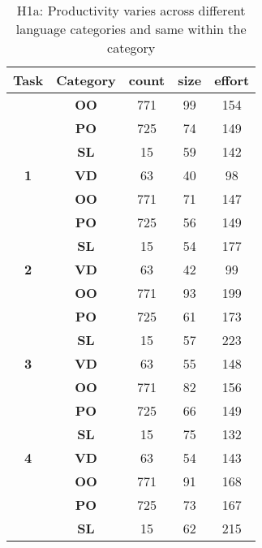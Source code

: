 
\begin{table}
\scriptsize
\renewcommand{\baselinestretch}{0.5} 
\centering
\caption{H1a: Productivity varies across different language categories and same within the category
}
\label{tab:h1a}
\begin{tabular}{|c|c|c|c|c|}
\hline
\textbf{Task} & \textbf{Category} & \textbf{count} & \textbf{size} & \textbf{effort} \\ \hline
 & \textbf{OO} & 771 & 99 & 154 \\ \cline{2-5} 
 & \textbf{PO} & 725 & 74 & 149 \\ \cline{2-5} 
 & \textbf{SL} & 15 & \cellcolor[HTML]{C0C0C0}59 & 142 \\ \cline{2-5} 
\multirow{-4}{*}{\textbf{1}} & \textbf{VD} & 63 & \cellcolor[HTML]{C0C0C0}40 & \cellcolor[HTML]{C0C0C0}98 \\ \hline
 & \textbf{OO} & 771 & 71 & 147 \\ \cline{2-5} 
 & \textbf{PO} & 725 & 56 & 149 \\ \cline{2-5} 
 & \textbf{SL} & 15 & \cellcolor[HTML]{C0C0C0}54 & 177 \\ \cline{2-5} 
\multirow{-4}{*}{\textbf{2}} & \textbf{VD} & 63 & \cellcolor[HTML]{C0C0C0}42 & \cellcolor[HTML]{C0C0C0}99 \\ \hline
 & \textbf{OO} & 771 & 93 & 199 \\ \cline{2-5} 
 & \textbf{PO} & 725 & \cellcolor[HTML]{C0C0C0}61 & 173 \\ \cline{2-5} 
 & \textbf{SL} & 15 & \cellcolor[HTML]{C0C0C0}57 & 223 \\ \cline{2-5} 
\multirow{-4}{*}{\textbf{3}} & \textbf{VD} & 63 & \cellcolor[HTML]{C0C0C0}55 & \cellcolor[HTML]{C0C0C0}148 \\ \hline
 & \textbf{OO} & 771 & 82 & \cellcolor[HTML]{C0C0C0}156 \\ \cline{2-5} 
 & \textbf{PO} & 725 & \cellcolor[HTML]{C0C0C0}66 & \cellcolor[HTML]{C0C0C0}149 \\ \cline{2-5} 
 & \textbf{SL} & 15 & \cellcolor[HTML]{C0C0C0}75 & \cellcolor[HTML]{C0C0C0}132 \\ \cline{2-5} 
\multirow{-4}{*}{\textbf{4}} & \textbf{VD} & 63 & \cellcolor[HTML]{C0C0C0}54 & \cellcolor[HTML]{C0C0C0}143 \\ \hline
 & \textbf{OO} & 771 & 91 & \cellcolor[HTML]{C0C0C0}168 \\ \cline{2-5} 
 & \textbf{PO} & 725 & 73 & \cellcolor[HTML]{C0C0C0}167 \\ \cline{2-5} 
 & \textbf{SL} & 15 & \cellcolor[HTML]{C0C0C0}62 & \cellcolor[HTML]{C0C0C0}215 \\ \cline{2-5} 

\end{tabular}
\end{table}
